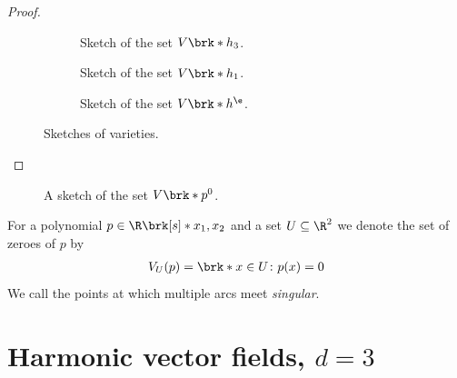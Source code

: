 \begin{proof}
\begin{figure}
\begin{subfigure}[b]{0.3\textwidth}
    \caption{Sketch of the set $V\brk*{h_3}$.}
    \label{fi:n3_polynomial_intersectionOriginDegenerate}
    \end{subfigure}
    \hfill
    \begin{subfigure}[b]{0.3\textwidth}
    \centering
    
    \caption{Sketch of the set $V\brk*{h_1}$.}
    \end{subfigure}
    \hfill
    \begin{subfigure}[b]{0.3\textwidth}
    \centering
    
    \caption{Sketch of the set $V\brk*{h^\e}$.}
    \label{fi:n3_polynomial_intersectionOriginRegular}
    \end{subfigure}
    \caption{Sketches of varieties.}
  \end{figure}
\end{proof}

\begin{figure}
  \centering
  
  \caption{A sketch of the set $V\brk*{p^0}$.}
\end{figure}

For a polynomial $p\in\R\brk[s]*{x_1,x_2}$ and a set $U\subseteq\R^2$ we denote the set of zeroes of $p$ by
\begin{align*}
  V_U(p)=\brk*{x\in U\colon p(x)=0}
\end{align*}
We call the points at which multiple arcs meet \emph{singular}.




\chapter{Harmonic vector fields, $d=3$}
